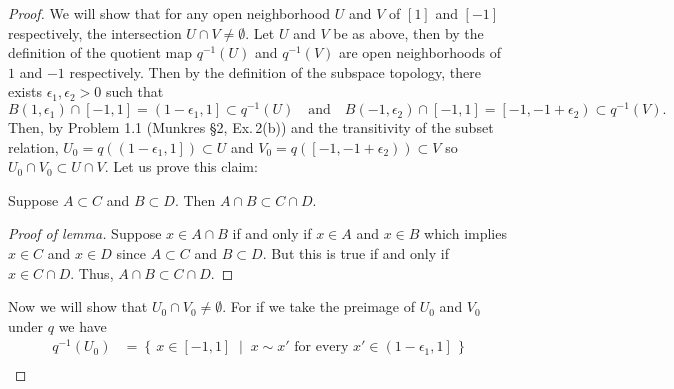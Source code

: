 \begin{proof}
We will show that for any open neighborhood $U$ and $V$ of $[1]$
and $[-1]$ respectively, the intersection $U\cap
V\neq\emptyset$. Let $U$ and $V$ be as above, then by the
definition of the quotient map $q^{-1}(U)$ and $q^{-1}(V)$ are
open neighborhoods of $1$ and $-1$ respectively. Then by the
definition of the subspace topology, there exists
$\epsilon_1,\epsilon_2>0$ such that
\[
B\left(1,\epsilon_1\right)\cap[-1,1]
=\left(1-\epsilon_1,1\right]
\subset q^{-1}(U)
\quad\text{and}\quad
B\left(-1,\epsilon_2\right)\cap[-1,1]
=\left[-1,-1+\epsilon_2\right)
\subset q^{-1}(V).
\]
Then, by Problem 1.1 (Munkres \S2, Ex.\,2(b)) and the transitivity
of the subset relation,
$U_0=q\left(\left(1-\epsilon_1,1\right]\right)\subset U$ and
$V_0=q\left(\left[-1,-1+\epsilon_2\right)\right)\subset V$ so
$U_0\cap V_0\subset U\cap V$. Let us prove this claim:
\begin{lemma}
Suppose $A\subset C$ and $B\subset D$. Then $A\cap B\subset C\cap
D$.
\end{lemma}
\begin{proof}[Proof of lemma]
\renewcommand\qedsymbol{$\clubsuit$}
Suppose $x\in A\cap B$ if and only if $x\in A$ and $x\in B$ which
implies $x\in C$ and $x\in D$ since $A\subset C$ and $B\subset
D$. But this is true if and only if $x\in C\cap D$. Thus, $A\cap
B\subset C\cap D$.
\end{proof}
Now we will show that $U_0\cap V_0\neq\emptyset$. For if we take the
preimage of $U_0$ and $V_0$ under $q$ we have
\begin{align*}
q^{-1}(U_0)&=\left\{\,x\in[-1,1]\;\middle|\;
\text{$x\sim x'$ for every $x'\in\left(1-\epsilon_1,1\right]$}\,\right\}\\

\end{align*}
\end{proof}
